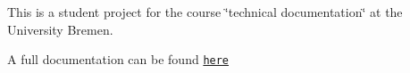 This is a student project for the course \char`\"{}technical documentation\char`\"{} at the University Bremen.

A full documentation can be found \href{https://datafridge.github.io/Ascii-Crawler/html/}{\tt here} 